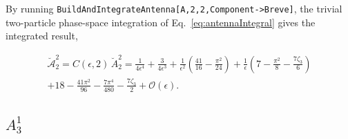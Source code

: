 \begin{sloppypar}
By running \texttt{BuildAndIntegrateAntenna[A,2,2,Component->Breve]}, the trivial two-particle
phase-space integration of Eq.~\eqref{eq:antennaIntegral} gives the integrated result,
\end{sloppypar}\noindent
\begin{equation}
    \begin{gathered}
        \breve{\mathcal A}_2^2 = C(\epsilon,2)\,\breve A_2^2 = \frac1{4\epsilon^4}+\frac3{4\epsilon^3}+\frac1{\epsilon^2}\!\left(\frac{41}{16}-\frac{\pi^2}{24}\right)+\frac1\epsilon\!\left(7-\frac{\pi^2}{8}-\frac{7\zeta_3}{6}\right)\\
        +18-\frac{41\pi^2}{96}-\frac{7\pi^4}{480}-\frac{7\zeta_3}{2}+\mathcal O(\epsilon).
    \end{gathered}
\end{equation}

\subsection{$A_3^1$}

